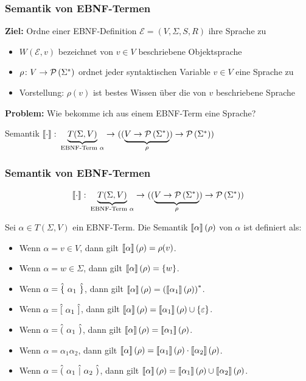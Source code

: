 \documentclass{beamer}
\begin{document}
\begin{frame} \frametitle{Semantik von EBNF-Termen}
	\small
	\textbf{Ziel:} Ordne einer EBNF-Definition $\mathcal{E} = (V,\Sigma,S,R)$ ihre Sprache zu
	\begin{itemize}
		\item $W(\mathcal{E}, v)$ bezeichnet von $v \in V$ beschriebene Objektsprache
		\item $\rho \colon V \to \mathcal{P}\left( \Sigma^\ast \right)$ ordnet jeder syntaktischen Variable $v \in V$ eine Sprache zu 
		\item Vorstellung: $\rho(v)$ ist bestes Wissen über die von $v$ beschriebene Sprache
	\end{itemize}
	\pause
	
	\textbf{Problem:} Wie bekomme ich aus einem EBNF-Term eine Sprache? 
		
	Semantik $\abb{\sem{\cdot}}{\underbrace{T(\Sigma, V)}_{\text{EBNF-Term } \alpha}}{((\underbrace{V \to \pows{\Sigma^\ast}}_{\rho}) \to \pows{\Sigma^\ast})}$
\end{frame}

\begin{frame} \frametitle{Semantik von EBNF-Termen}
	\begin{equation*}
		\abb{\sem{\cdot}}{\underbrace{T(\Sigma, V)}_{\text{EBNF-Term } \alpha}}{((\underbrace{V \to \pows{\Sigma^\ast}}_{\rho}) \to \pows{\Sigma^\ast})}
	\end{equation*}
	
	Sei $\alpha \in T(\Sigma, V)$ ein EBNF-Term. Die Semantik  $\left\llbracket \alpha \right\rrbracket(\rho)$ von $\alpha$ ist definiert als:
	\begin{itemize}
		\item Wenn $\alpha = v \in V$, dann gilt $\left\llbracket \alpha \right\rrbracket(\rho) = \rho(v)$.
		\item Wenn $\alpha = w \in \Sigma$, dann gilt $\left\llbracket \alpha \right\rrbracket(\rho) = \left\{ w \right\}$.
		\medskip
		\item Wenn $\alpha = \hat{\{} \ \alpha_1 \ \hat{\}}$, dann gilt $\left\llbracket \alpha \right\rrbracket(\rho) = \left( \left\llbracket \alpha_1 \right\rrbracket(\rho) \right)^\ast$.
		\item Wenn $\alpha = \hat{[} \ \alpha_1 \ \hat{]}$, dann gilt $\left\llbracket \alpha \right\rrbracket(\rho) = \left\llbracket \alpha_1 \right\rrbracket(\rho) \cup \left\{ \varepsilon \right\}$.
		\item Wenn $\alpha = \hat{(} \ \alpha_1 \ \hat{)}$, dann gilt $\left\llbracket \alpha \right\rrbracket(\rho) = \left\llbracket \alpha_1 \right\rrbracket(\rho)$.
		\medskip
		\item Wenn $\alpha = \alpha_1 \alpha_2$, dann gilt $\left\llbracket \alpha \right\rrbracket(\rho) = \left\llbracket \alpha_1 \right\rrbracket(\rho) \cdot \left\llbracket \alpha_2 \right\rrbracket(\rho)$.
		\item Wenn $\alpha = \hat{(} \ \alpha_1 \ \hat{|} \ \alpha_2 \ \hat{)}$, dann gilt $\left\llbracket \alpha \right\rrbracket(\rho) = \left\llbracket \alpha_1 \right\rrbracket(\rho) \cup \left\llbracket \alpha_2 \right\rrbracket(\rho)$.
	\end{itemize}
\end{frame}
\end{document}
